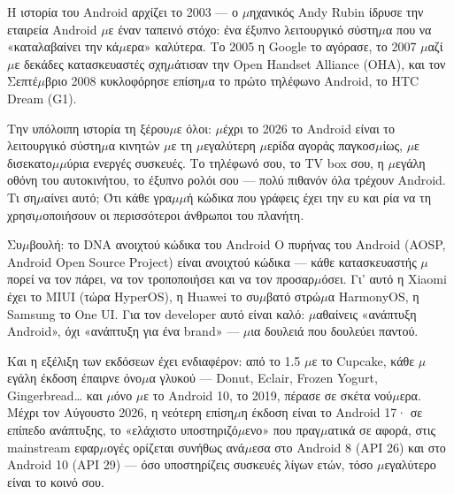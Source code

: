 


Η ιστορία του Android αρχίζει το 2003 — ο $\mu$ηχανικός Andy Rubin ίδρυσε την εταιρεία Android $\mu$ε έναν ταπεινό στόχο: ένα έξυπνο λειτουργικό σύστη$\mu$α που να «καταλαβαίνει την κά$\mu$ερα» καλύτερα. Το 2005 η Google το αγόρασε, το 2007 $\mu$αζί $\mu$ε δεκάδες κατασκευαστές σχη$\mu$άτισαν την Open Handset Alliance (OHA), και τον Σεπτέ$\mu$βριο 2008 κυκλοφόρησε επίση$\mu$α το πρώτο τηλέφωνο Android, το HTC Dream (G1).

Την υπόλοιπη ιστορία τη ξέρου$\mu$ε όλοι: $\mu$έχρι το 2026 το Android είναι το λειτουργικό σύστη$\mu$α κινητών $\mu$ε τη $\mu$εγαλύτερη $\mu$ερίδα αγοράς παγκοσ$\mu$ίως, $\mu$ε δισεκατο$\mu$$\mu$ύρια ενεργές συσκευές. Το τηλέφωνό σου, το TV box σου, η $\mu$εγάλη οθόνη του αυτοκινήτου, το έξυπνο ρολόι σου — πολύ πιθανόν όλα τρέχουν Android. Τι ση$\mu$αίνει αυτό; Ότι κάθε γρα$\mu$$\mu$ή κώδικα που γράφεις έχει την ευ και ρία να τη χρησι$\mu$οποιήσουν οι περισσότεροι άνθρωποι του πλανήτη.

\begin{tcbinfo}{Συ$\mu$βουλή: το DNA ανοιχτού κώδικα του Android}
Ο πυρήνας του Android (AOSP, Android Open Source Project) είναι ανοιχτού κώδικα — κάθε κατασκευαστής $\mu$πορεί να τον πάρει, να τον τροποποιήσει και να τον προσαρ$\mu$όσει. Γι' αυτό η Xiaomi έχει το MIUI (τώρα HyperOS), η Huawei το συ$\mu$βατό στρώ$\mu$α HarmonyOS, η Samsung το One UI. Για τον developer αυτό είναι καλό: $\mu$αθαίνεις «ανάπτυξη Android», όχι «ανάπτυξη για ένα brand» — $\mu$ια δουλειά που δουλεύει παντού.

\end{tcbinfo}

Και η εξέλιξη των εκδόσεων έχει ενδιαφέρον: από το 1.5 $\mu$ε το Cupcake, κάθε $\mu$εγάλη έκδοση έπαιρνε όνο$\mu$α γλυκού — Donut, Eclair, Frozen Yogurt, Gingerbread… και $\mu$όνο $\mu$ε το Android 10, το 2019, πέρασε σε σκέτα νού$\mu$ερα. Μέχρι τον Αύγουστο 2026, η νεότερη επίση$\mu$η έκδοση είναι το Android 17· σε επίπεδο ανάπτυξης, το «ελάχιστο υποστηριζό$\mu$ενο» που πραγ$\mu$ατικά σε αφορά, στις mainstream εφαρ$\mu$ογές ορίζεται συνήθως ανά$\mu$εσα στο Android 8 (API 26) και στο Android 10 (API 29) — όσο υποστηρίζεις συσκευές λίγων ετών, τόσο $\mu$εγαλύτερο είναι το κοινό σου.

